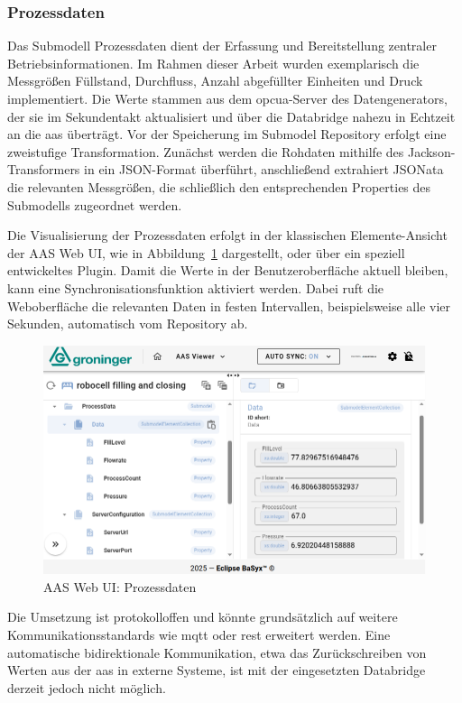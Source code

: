 \subsubsection*{Prozessdaten}

Das Submodell Prozessdaten dient der Erfassung und Bereitstellung zentraler Betriebsinformationen.
Im Rahmen dieser Arbeit wurden exemplarisch die Messgrößen Füllstand, Durchfluss, Anzahl abgefüllter Einheiten und Druck implementiert.
Die Werte stammen aus dem \acs{opcua}-Server des Datengenerators, der sie im Sekundentakt aktualisiert und über die Databridge nahezu in Echtzeit an die \acs{aas} überträgt.
Vor der Speicherung im Submodel Repository erfolgt eine zweistufige Transformation.
Zunächst werden die Rohdaten mithilfe des Jackson-Transformers in ein JSON-Format überführt, anschließend extrahiert JSONata die relevanten Messgrößen, die schließlich den entsprechenden Properties des Submodells zugeordnet werden.

Die Visualisierung der Prozessdaten erfolgt in der klassischen Elemente-Ansicht der AAS Web UI, wie in Abbildung~\ref{fig:Processdata} dargestellt, oder über ein speziell entwickeltes Plugin.
Damit die Werte in der Benutzeroberfläche aktuell bleiben, kann eine Synchronisationsfunktion aktiviert werden.
Dabei ruft die Weboberfläche die relevanten Daten in festen Intervallen, beispielsweise alle vier Sekunden, automatisch vom Repository ab.

\newpage
\begin{figure}[htbp]
    \centering
    \includegraphics[width=1\textwidth]{Bilder/Ergebnisse/DynamischeDaten/ProcessData/VisualisierungNeu.png}
    \caption{AAS Web UI: Prozessdaten}
    \label{fig:Processdata}
\end{figure}

Die Umsetzung ist protokolloffen und könnte grundsätzlich auf weitere Kommunikationsstandards wie \acs{mqtt} oder \acs{rest} erweitert werden.
Eine automatische bidirektionale Kommunikation, etwa das Zurückschreiben von Werten aus der \acs{aas} in externe Systeme, ist mit der eingesetzten Databridge derzeit jedoch nicht möglich.

